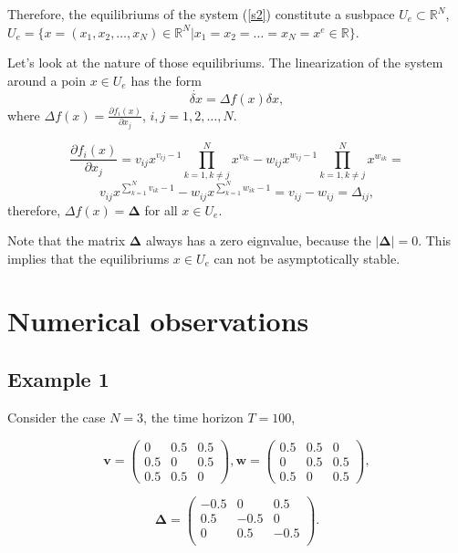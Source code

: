 \documentclass[a4paper,10pt, english]{article}
\newcommand{\D}{\displaystyle}
\begin{document}
Therefore, the equilibriums of the system (\ref{s2}) constitute a susbpace $U_e\subset\mathbb{R}^N$, $U_e = \{x = (x_1, x_2, \ldots, x_N)\in\mathbb{R}^N | x_1 =  x_2 = \ldots = x_N = x^e\in\mathbb{R}\}$.


\newpage
Let's look at the nature of those equilibriums. The linearization of the system around a poin $x\in U_e$ has the form
$$
\dot{\delta x} = \Delta f(x) \delta x,
$$
where $\D \Delta f(x) = \frac{\partial f_i(x)}{\partial x_j}$, $i, j =1, 2, \ldots, N.$

$$
\frac{\partial f_i(x)}{\partial x_j} = v_{ij}x^{v_{ij}-1}\prod_{k=1, k\neq j}^{N}x^{v_{ik}} - w_{ij}x^{w_{ij}-1}\prod_{k=1, k\neq j}^{N}x^{w_{ik}} =
$$
$$
v_{ij}x^{\sum_{k=1}^{N}v_{ik} - 1} - w_{ij}x^{\sum_{k=1}^{N}w_{ik} - 1} = v_{ij} - w_{ij} = \Delta_{ij},
$$
therefore,  $\Delta f(x) = \mathbf{\Delta}$ for all $x\in U_e$.

Note that the matrix $\mathbf{\Delta}$ always has a zero eignvalue, because the $|\mathbf{\Delta}| = 0$. This implies that the equilibriums $x\in U_e$ can not be asymptotically stable.

\newpage
\section{Numerical observations}
\subsection{Example 1}


Consider the case $N=3$, the time horizon $T = 100$,


\[\mathbf{v} =  \left( \begin{array}{ccc}
0 & 0.5 & 0.5 \\
0.5 & 0 & 0.5 \\
0.5 & 0.5 & 0 
\end{array} \right),
%
\mathbf{w} = 
\left( \begin{array}{ccc}
0.5 & 0.5 & 0 \\
0 & 0.5 & 0.5 \\
0.5 & 0 & 0.5 
\end{array} \right),
\]

$$
\mathbf{\Delta} = 
\left(
\begin{matrix}
-0.5   & 0 & 0.5 \\
0.5 &  -0.5 & 0 \\
0 &  0.5 & -0.5 \\
\end{matrix}
\right).
$$
\end{document}
